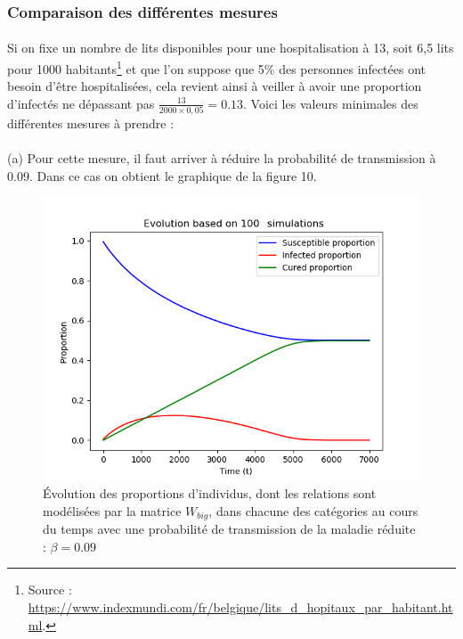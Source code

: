 \documentclass[a4paper, 12pt, oneside]{article}
\begin{document}
\subsubsection{Comparaison des différentes mesures}

\paragraph{}Si on fixe un nombre de lits disponibles pour une hospitalisation à 13, soit 6,5 lits pour 1000 habitants\footnote{Source : \url{https://www.indexmundi.com/fr/belgique/lits_d_hopitaux_par_habitant.html}.} et que l'on suppose que 5\% des personnes infectées ont besoin d'être hospitalisées, cela revient ainsi à veiller à avoir une proportion d'infectés ne dépassant pas $\frac{13}{2000 \times 0,05} = 0.13$. Voici les valeurs minimales des différentes mesures à prendre :

\paragraph{}(a) Pour cette mesure, il faut arriver à réduire la probabilité de transmission à 0.09. Dans ce cas on obtient le graphique de la figure 10.

\begin{figure}[H]
	\centering
	\includegraphics[scale=1]{Wbig_dense_reduction_transmission_comparaison.png} 
	\caption{Évolution des proportions d'individus, dont les relations sont modélisées par la matrice $W_{big}$, dans chacune des catégories au cours du temps avec une probabilité de transmission de la maladie réduite : $\beta = 0.09$}
\end{figure}
\end{document}

